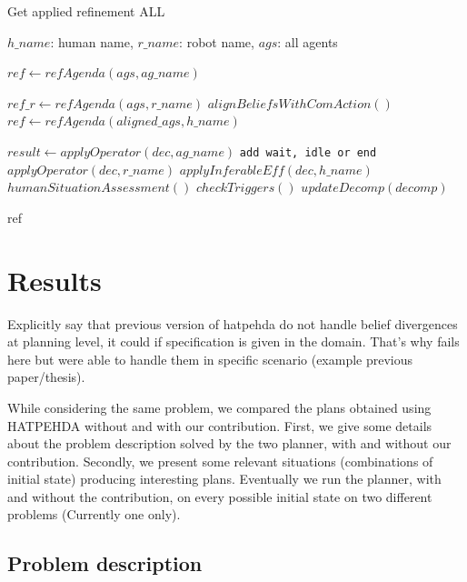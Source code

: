 \documentclass[letterpaper]{article} %
\begin{document}
\begin{algorithm}
\caption{Get applied refinement ALL}\label{alg:ap_ref_all}
\begin{algorithmic}
\Require $h\_name$: human name, $r\_name$: robot name, $ags$: all agents

\State $ref \gets refAgenda(ags, ag\_name)$

\State $ref\_r \gets refAgenda(ags, r\_name)$ 
 
    \State $alignBeliefsWithComAction()$
    \State $ref \gets refAgenda(aligned\_ags, h\_name)$
\EndIf


    \State $result \gets applyOperator(dec, ag\_name)$ 
        \State \texttt{add wait, idle or end}
    \Else
        \State $applyOperator(dec, r\_name)$ 
        \State $applyInferableEff(dec, h\_name)$ 
        \State $humanSituationAssessment()$
        \State $checkTriggers()$
        \State $updateDecomp(decomp)$
    \EndIf
\EndFor

\State \Return ref

\end{algorithmic}
\end{algorithm}



\section{Results}


Explicitly say that previous version of hatpehda do not handle belief divergences at planning level, it could if specification is given in the domain. That's why fails here but were able to handle them in specific scenario (example previous paper/thesis).

While considering the same problem, we compared the plans obtained using HATPEHDA without and with our contribution. First, we give some details about the problem description solved by the two planner, with and without our contribution. Secondly, we present some relevant situations (combinations of initial state) producing interesting plans. Eventually we run the planner, with and without the contribution, on every possible initial state on two different problems (Currently one only).  

\subsection{Problem description}
\end{document}
